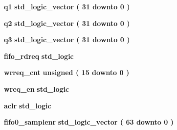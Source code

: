 \begin{DoxyCompactItemize}
\item 
{\bf q1} {\bfseries \textcolor{comment}{std\+\_\+logic\+\_\+vector}\textcolor{vhdlchar}{ }\textcolor{vhdlchar}{(}\textcolor{vhdlchar}{ }\textcolor{vhdlchar}{ } \textcolor{vhdldigit}{31} \textcolor{vhdlchar}{ }\textcolor{keywordflow}{downto}\textcolor{vhdlchar}{ }\textcolor{vhdlchar}{ } \textcolor{vhdldigit}{0} \textcolor{vhdlchar}{ }\textcolor{vhdlchar}{)}\textcolor{vhdlchar}{ }} 
\item 
{\bf q2} {\bfseries \textcolor{comment}{std\+\_\+logic\+\_\+vector}\textcolor{vhdlchar}{ }\textcolor{vhdlchar}{(}\textcolor{vhdlchar}{ }\textcolor{vhdlchar}{ } \textcolor{vhdldigit}{31} \textcolor{vhdlchar}{ }\textcolor{keywordflow}{downto}\textcolor{vhdlchar}{ }\textcolor{vhdlchar}{ } \textcolor{vhdldigit}{0} \textcolor{vhdlchar}{ }\textcolor{vhdlchar}{)}\textcolor{vhdlchar}{ }} 
\item 
{\bf q3} {\bfseries \textcolor{comment}{std\+\_\+logic\+\_\+vector}\textcolor{vhdlchar}{ }\textcolor{vhdlchar}{(}\textcolor{vhdlchar}{ }\textcolor{vhdlchar}{ } \textcolor{vhdldigit}{31} \textcolor{vhdlchar}{ }\textcolor{keywordflow}{downto}\textcolor{vhdlchar}{ }\textcolor{vhdlchar}{ } \textcolor{vhdldigit}{0} \textcolor{vhdlchar}{ }\textcolor{vhdlchar}{)}\textcolor{vhdlchar}{ }} 
\item 
{\bf fifo\+\_\+rdreq} {\bfseries \textcolor{comment}{std\+\_\+logic}\textcolor{vhdlchar}{ }} 
\item 
{\bf wrreq\+\_\+cnt} {\bfseries \textcolor{comment}{unsigned}\textcolor{vhdlchar}{ }\textcolor{vhdlchar}{(}\textcolor{vhdlchar}{ }\textcolor{vhdlchar}{ } \textcolor{vhdldigit}{15} \textcolor{vhdlchar}{ }\textcolor{keywordflow}{downto}\textcolor{vhdlchar}{ }\textcolor{vhdlchar}{ } \textcolor{vhdldigit}{0} \textcolor{vhdlchar}{ }\textcolor{vhdlchar}{)}\textcolor{vhdlchar}{ }} 
\item 
{\bf wreq\+\_\+en} {\bfseries \textcolor{comment}{std\+\_\+logic}\textcolor{vhdlchar}{ }} 
\item 
{\bf aclr} {\bfseries \textcolor{comment}{std\+\_\+logic}\textcolor{vhdlchar}{ }} 
\item 
{\bf fifo0\+\_\+samplenr} {\bfseries \textcolor{comment}{std\+\_\+logic\+\_\+vector}\textcolor{vhdlchar}{ }\textcolor{vhdlchar}{(}\textcolor{vhdlchar}{ }\textcolor{vhdlchar}{ } \textcolor{vhdldigit}{63} \textcolor{vhdlchar}{ }\textcolor{keywordflow}{downto}\textcolor{vhdlchar}{ }\textcolor{vhdlchar}{ } \textcolor{vhdldigit}{0} \textcolor{vhdlchar}{ }\textcolor{vhdlchar}{)}\textcolor{vhdlchar}{ }} 
\item 

\end{DoxyCompactItemize}
